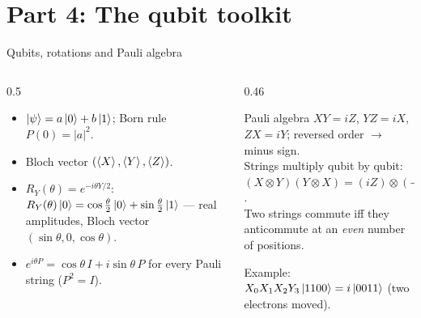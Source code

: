 \documentclass[aspectratio=169,11pt]{beamer}
\begin{document}
\section{Part 4: The qubit toolkit}
\begin{frame}{Qubits, rotations and Pauli algebra}
  \begin{columns}[T]
    \begin{column}{0.5\textwidth}
      \begin{itemize}
        \item $\ket\psi = a\ket0 + b\ket1$; Born rule $P(0) = |a|^2$.
        \item Bloch vector $(\braket X, \braket Y, \braket Z)$.
        \item $R_Y(\theta) = e^{-i\theta Y/2}$: $R_Y(\theta)\ket0 = \cos\frac\theta2\ket0 + \sin\frac\theta2\ket1$ --- real amplitudes, Bloch vector $(\sin\theta, 0, \cos\theta)$.
        \item $e^{i\theta P} = \cos\theta\,I + i\sin\theta\,P$ for every Pauli string ($P^2 = I$).
      \end{itemize}
    \end{column}
    \begin{column}{0.46\textwidth}
      \begin{block}{Pauli algebra}
        $XY = iZ$, $YZ = iX$, $ZX = iY$; reversed order $\to$ minus sign.\\
        Strings multiply qubit by qubit: $(X\otimes Y)(Y\otimes X) = (iZ)\otimes(-iZ) = Z\otimes Z$.\\
        Two strings commute iff they anticommute at an \emph{even} number of positions.
      \end{block}
      \small Example: $X_0X_1X_2Y_3\ket{1100} = i\ket{0011}$ (two electrons moved).
    \end{column}
  \end{columns}
\end{frame}
\end{document}
